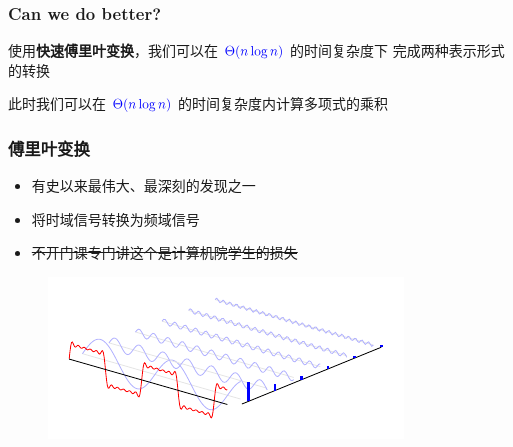 \documentclass[UTF8]{ctexbeamer}
\begin{document}
\begin{frame}
    \frametitle{Can we do better?}
    使用\textbf{快速傅里叶变换}，我们可以在
    $\textcolor{blue}{\Theta(n \log n)}$ 的时间复杂度下
    完成两种表示形式的转换
 
    此时我们可以在 $\textcolor{blue}{\Theta(n \log n)}$
    的时间复杂度内计算多项式的乘积
\end{frame}

\begin{frame}
    \frametitle{傅里叶变换}
    \begin{itemize}
        \item 有史以来最伟大、最深刻的发现之一
        \item 将时域信号转换为频域信号
        \item \sout{不开门课专门讲这个是计算机院学生的损失}
    \end{itemize}
    \begin{figure}
        \includegraphics[width= 0.8\linewidth]{ft.pdf}
     \end{figure}
\end{frame}
\end{document}

